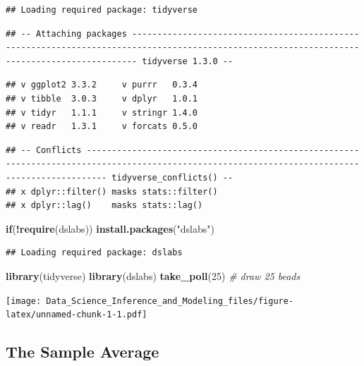 \documentclass[
]{article}
\newenvironment{Shaded}{\begin{snugshade}}{\end{snugshade}}
\newcommand{\CommentTok}[1]{\textcolor[rgb]{0.56,0.35,0.01}{\textit{#1}}}
\newcommand{\ControlFlowTok}[1]{\textcolor[rgb]{0.13,0.29,0.53}{\textbf{#1}}}
\newcommand{\DecValTok}[1]{\textcolor[rgb]{0.00,0.00,0.81}{#1}}
\newcommand{\KeywordTok}[1]{\textcolor[rgb]{0.13,0.29,0.53}{\textbf{#1}}}
\newcommand{\NormalTok}[1]{#1}
\newcommand{\OperatorTok}[1]{\textcolor[rgb]{0.81,0.36,0.00}{\textbf{#1}}}
\newcommand{\StringTok}[1]{\textcolor[rgb]{0.31,0.60,0.02}{#1}}
\begin{document}
\begin{verbatim}
## Loading required package: tidyverse
\end{verbatim}

\begin{verbatim}
## -- Attaching packages --------------------------------------------------------------------------------------------------------------------------------------------- tidyverse 1.3.0 --
\end{verbatim}

\begin{verbatim}
## v ggplot2 3.3.2     v purrr   0.3.4
## v tibble  3.0.3     v dplyr   1.0.1
## v tidyr   1.1.1     v stringr 1.4.0
## v readr   1.3.1     v forcats 0.5.0
\end{verbatim}

\begin{verbatim}
## -- Conflicts ------------------------------------------------------------------------------------------------------------------------------------------------ tidyverse_conflicts() --
## x dplyr::filter() masks stats::filter()
## x dplyr::lag()    masks stats::lag()
\end{verbatim}

\begin{Shaded}
\begin{Highlighting}[]
\ControlFlowTok{if}\NormalTok{(}\OperatorTok{!}\KeywordTok{require}\NormalTok{(dslabs)) }\KeywordTok{install.packages}\NormalTok{(}\StringTok{"dslabs"}\NormalTok{)}
\end{Highlighting}
\end{Shaded}

\begin{verbatim}
## Loading required package: dslabs
\end{verbatim}

\begin{Shaded}
\begin{Highlighting}[]
\KeywordTok{library}\NormalTok{(tidyverse)}
\KeywordTok{library}\NormalTok{(dslabs)}
\KeywordTok{take\_poll}\NormalTok{(}\DecValTok{25}\NormalTok{)    }\CommentTok{\# draw 25 beads}
\end{Highlighting}
\end{Shaded}

\texttt{[image: Data\_Science\_Inference\_and\_Modeling\_files/figure-latex/unnamed-chunk-1-1.pdf]}

\hypertarget{the-sample-average}{%
\subsection{The Sample Average}\label{the-sample-average}}
\end{document}
